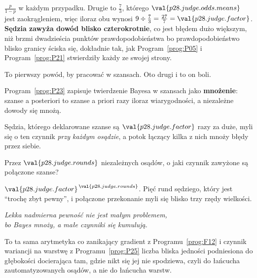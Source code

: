\begin{fr}

$\frac{p}{1-p}$ w każdym przypadku. Drugie to $\frac{7}{3}$, którego
$\val{p28.judge.odds.means}$ jest zaokrągleniem, więc iloraz obu wynosi
$9 \div \frac{7}{3} = \frac{27}{7} = \val{p28.judge.factor}$. \textbf{Sędzia
zawyża dowód blisko
czterokrotnie}, co jest błędem dużo większym, niż brzmi dwadzieścia punktów
prawdopodobieństwa \dash{} bo prawdopodobieństwo blisko granicy ściska się,
dokładnie tak, jak Program~\ref{prog:P05} i Program~\ref{prog:P21} stwierdziły
każdy ze swojej strony.

To pierwszy powód, by pracować w szansach. Oto drugi i to on boli.
\end{fr}

\begin{fr}
Program~\ref{prog:P23} zapisuje twierdzenie Bayesa w szansach jako
\textbf{mnożenie}: szanse a posteriori to szanse a priori razy iloraz
wiarygodności, a niezależne dowody się mnożą.

Sędzia, którego deklarowane szanse są $\val{p28.judge.factor}$ razy za duże,
myli się o ten czynnik \emph{przy każdym osądzie}, a potok łączący kilka z
nich mnoży błędy przez siebie.

Przez $\val{p28.judge.rounds}$ niezależnych osądów, o jaki czynnik zawyżone są
połączone szanse?
\dotline
\nextframe
\end{fr}

\begin{fr}

$\val{p28.judge.factor}^{\,\val{p28.judge.rounds}}$. Pięć rund sędziego, który
jest \enquote{trochę zbyt pewny}, i połączone przekonanie myli się blisko
trzy rzędy wielkości.

\begin{center}
\emph{Lekka nadmierna pewność nie jest małym problemem,\\
bo Bayes mnoży, a małe czynniki się kumulują.}
\end{center}

To ta sama arytmetyka co zanikający gradient z Programu~\ref{prog:F12} i
czynnik wariancji na warstwę z Programu~\ref{prog:P25} \dash{} liczba bliska
jedności podniesiona do głębokości \dash{} docierająca tam, gdzie nikt się jej
nie spodziewa, czyli do łańcucha zautomatyzowanych osądów, a nie do łańcucha
warstw.
\end{fr}


